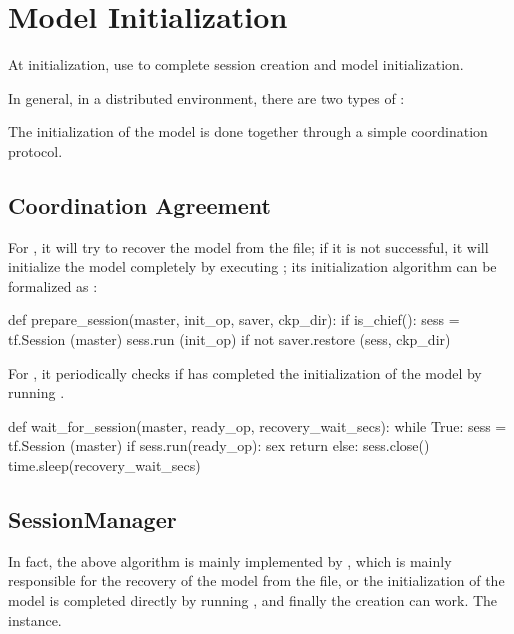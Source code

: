 \section{Model Initialization}
\begin{content}
 At initialization, use  to complete session creation and model initialization.

In general, in a distributed environment, there are two types of :

\begin{enum}
\end{enum}

The initialization of the model is done together through a simple coordination protocol.


\subsection{Coordination Agreement}
For , it will try to recover the model from the  file; if it is not successful, it will initialize the model completely by executing ; its initialization algorithm can be formalized as :

\begin{leftbar}
\begin{python}
def prepare_session(master, init_op, saver, ckp_dir):
  if is_chief():
    sess = tf.Session (master)
    sess.run (init_op) if not saver.restore (sess, ckp_dir)
\end{python}
\end{leftbar}

For , it periodically checks if  has completed the initialization of the model by running .

\begin{leftbar}
\begin{python}
def wait_for_session(master, ready_op, recovery_wait_secs):
  while True:
    sess = tf.Session (master)
    if sess.run(ready_op):
      sex return
    else:
      sess.close()
      time.sleep(recovery_wait_secs)   
\end{python}
\end{leftbar}


\subsection{SessionManager}
In fact, the above algorithm is mainly implemented by , which is mainly responsible for the recovery of the model from the  file, or the initialization of the model is completed directly by running , and finally the creation can work. The  instance.


\end{content}
